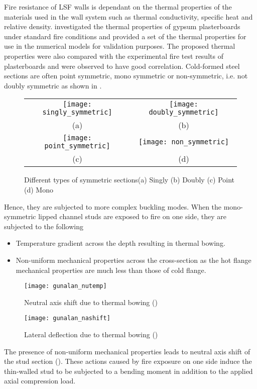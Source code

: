 Fire resistance of LSF walls is dependant on the thermal properties of the materials used in the wall system such as thermal conductivity, specific heat and relative density. \citet{Keerthan2012} investigated the thermal properties of gypsum plasterboards under standard fire conditions and provided a set of the thermal properties for use in the numerical models for validation purposes. The proposed thermal properties were also compared with the experimental fire test results of plasterboards and were observed to have good correlation. Cold-formed steel sections are often point symmetric, mono symmetric or non-symmetric, i.e. not doubly symmetric as shown in . 
\begin{figure}[!htbp]
	\centering
		\begin{tabular}{cc}
			\texttt{[image: singly\_symmetric]} & \texttt{[image: doubly\_symmetric]} \\ 
			(a) & (b)  \\ 
			\texttt{[image: point\_symmetric]} & \texttt{[image: non\_symmetric]} \\ 
			(c) & (d)  \\
		\end{tabular} 
		\caption{Different types of symmetric sections(a) Singly (b) Doubly (c) Point (d) Mono}
		\label{fig:symmetry}
\end{figure}
Hence, they are subjected to more complex buckling modes. When the mono-symmetric lipped channel studs are exposed to fire on one side, they are subjected to the following
\begin{itemize}
	\item Temperature gradient across the depth resulting in thermal bowing.
	\item Non-uniform mechanical properties across the cross-section as the hot flange mechanical properties are much less than those of cold flange.
\end{itemize}
\begin{figure}[htbp]
	\centering	
		\texttt{[image: gunalan\_nutemp]}
		\caption{Neutral axis shift due to thermal bowing (\cite{Gunalan2014j})}
		\label{fig:gunalan_nutemp}
\end{figure}
\begin{figure}[htbp]
	\centering	
		\texttt{[image: gunalan\_nashift]}
		\caption{Lateral deflection due to thermal bowing (\cite{Gunalan2014j})}
		\label{fig:gunalan_nashift}
\end{figure}
The presence of non-uniform mechanical properties leads to neutral axis shift of the stud section (). These actions caused by fire exposure on one side induce the thin-walled stud to be subjected to a bending moment in addition to the applied axial compression load.

